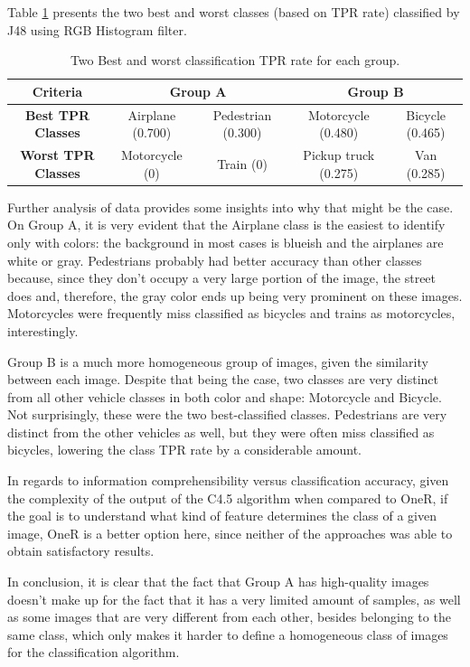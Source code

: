 \documentclass{article}
\begin{document}
Table \ref{tab:best_worst} presents the two best and worst classes (based on TPR rate) classified by J48 using RGB Histogram filter.


\begin{table}[htbp]
    \centering
    \begin{tabular}{c|c|c|c|c}
         \textbf{Criteria} & \multicolumn{2}{c|}{\textbf{Group A}} & \multicolumn{2}{c|}{\textbf{Group B}} \\ \hline
         \textbf{Best TPR Classes} & Airplane (0.700) & Pedestrian (0.300) & Motorcycle (0.480) & Bicycle (0.465) \\
         \textbf{Worst TPR Classes} & Motorcycle (0)  & Train (0) & Pickup truck (0.275) & Van (0.285) \\
    \end{tabular}
    \caption{Two Best and worst classification TPR rate for each group.}
    \label{tab:best_worst}
\end{table}

Further analysis of data provides some insights into why that might be the case. On Group A, it is very evident that the Airplane class is the easiest to identify only with colors: the background in most cases is blueish and the airplanes are white or gray. 
Pedestrians probably had better accuracy than other classes because, since they don't occupy a very large portion of the image, the street does and, therefore, the gray color ends up being very prominent on these images.
Motorcycles were frequently miss classified as bicycles and trains as motorcycles, interestingly. 

Group B is a much more homogeneous group of images, given the similarity between each image. Despite that being the case, two classes are very distinct from all other vehicle classes in both color and shape: Motorcycle and Bicycle. Not surprisingly, these were the two best-classified classes. Pedestrians are very distinct from the other vehicles as well, but they were often miss classified as bicycles, lowering the class TPR rate by a considerable amount.

In regards to information comprehensibility versus classification accuracy, given the complexity of the output of the C4.5 algorithm when compared to OneR, if the goal is to understand what kind of feature determines the class of a given image, OneR is a better option here, since neither of the approaches was able to obtain satisfactory results.

In conclusion, it is clear that the fact that Group A has high-quality images doesn't make up for the fact that it has a very limited amount of samples,  as well as some images that are very different from each other, besides belonging to the same class, which only makes it harder to define a homogeneous class of images for the classification algorithm.
\end{document}
